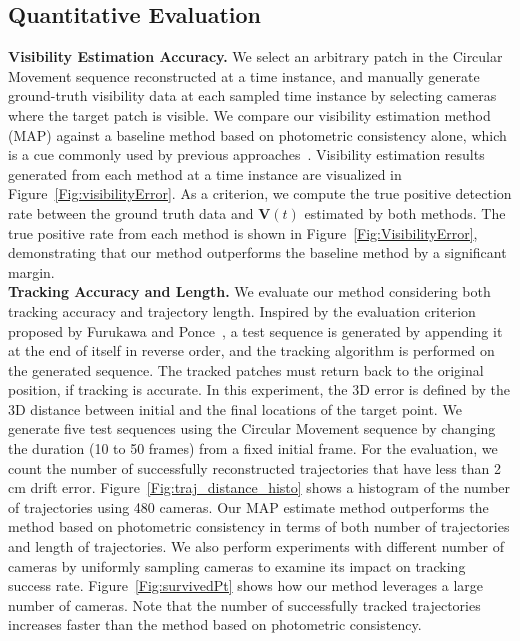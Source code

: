 
\subsection{Quantitative Evaluation}
\noindent\textbf{Visibility Estimation Accuracy.} We select an arbitrary patch in the Circular Movement sequence reconstructed at a time instance, and manually generate ground-truth visibility data at each sampled time instance by selecting cameras where the target patch is visible. We compare our visibility estimation method (MAP) against a baseline method based on photometric consistency alone, which is a cue commonly used by previous approaches~\cite{Carceroni2002,Devernay2006,Furukawa2008}. Visibility estimation results generated from each method at a time instance are visualized in Figure~\ref{Fig:visibilityError}. As a criterion, we compute the true positive detection rate between the ground truth data and $\mathbf{V}(t)$ estimated by both methods. The true positive rate from each method is shown in Figure~\ref{Fig:VisibilityError}, demonstrating that our method outperforms the baseline method by a significant margin.\\ %
\noindent \textbf{Tracking Accuracy and Length.}
We evaluate our method considering both tracking accuracy and trajectory length. Inspired by the evaluation criterion proposed by Furukawa and Ponce~\cite{Furukawa2008}, a test sequence is generated by appending it at the end of itself in reverse order, and the tracking algorithm is performed on the generated sequence. The tracked patches must return back to the original position, if tracking is accurate. In this experiment, the 3D error is defined by the 3D distance between initial and the final locations of the target point. We generate five test sequences using the Circular Movement sequence by changing the duration (10 to 50 frames) from a fixed initial frame. For the evaluation, we count the number of successfully reconstructed trajectories that have less than 2 cm drift error. Figure~\ref{Fig:traj_distance_histo} shows a histogram of the number of trajectories using 480 cameras.  Our MAP estimate method outperforms the method based on photometric consistency in terms of both number of trajectories and length of trajectories. We also perform experiments with different number of cameras by uniformly sampling cameras to examine its impact on tracking success rate. Figure~\ref{Fig:survivedPt} shows how our method leverages a large number of cameras. Note that the number of successfully tracked trajectories increases faster than the method based on photometric consistency. 

